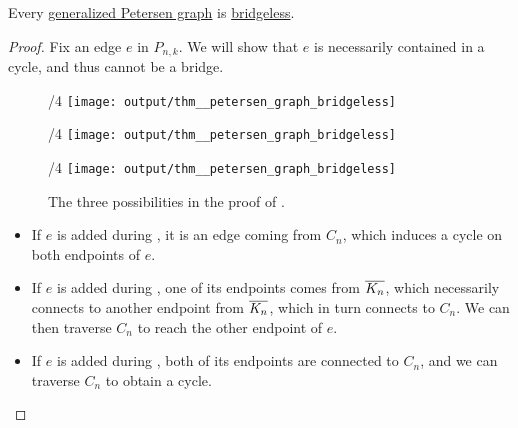 \begin{proposition}\label{thm:petersen_graph_bridgeless}
  Every \hyperref[def:petersen_graph]{generalized Petersen graph} is \hyperref[def:bridgeless_graph]{bridgeless}.
\end{proposition}
\begin{proof}
  Fix an edge \( e \) in \( P_{n,k} \). We will show that \( e \) is necessarily contained in a cycle, and thus cannot be a bridge.

  \begin{figure}[!ht]
    \begin{subcaptionblock}{\textwidth/4}
      \centering
      \texttt{[image: output/thm\_\_petersen\_graph\_bridgeless]}
    \end{subcaptionblock}
    \hfill
    \begin{subcaptionblock}{\textwidth/4}
      \centering
      \texttt{[image: output/thm\_\_petersen\_graph\_bridgeless]}
    \end{subcaptionblock}
    \hfill
    \begin{subcaptionblock}{\textwidth/4}
      \centering
      \texttt{[image: output/thm\_\_petersen\_graph\_bridgeless]}
    \end{subcaptionblock}

    \caption{The three possibilities in the proof of .}\label{fig:thm:petersen_graph_bridgeless/proof}
  \end{figure}

  \begin{itemize}
    \item If \( e \) is added during , it is an edge coming from \( C_n \), which induces a cycle on both endpoints of \( e \).

    \item If \( e \) is added during , one of its endpoints comes from \( \oline{K_n} \), which necessarily connects to another endpoint from \( \oline{K_n} \), which in turn connects to \( C_n \). We can then traverse \( C_n \) to reach the other endpoint of \( e \).

    \item If \( e \) is added during , both of its endpoints are connected to \( C_n \), and we can traverse \( C_n \) to obtain a cycle.
  \end{itemize}
\end{proof}


